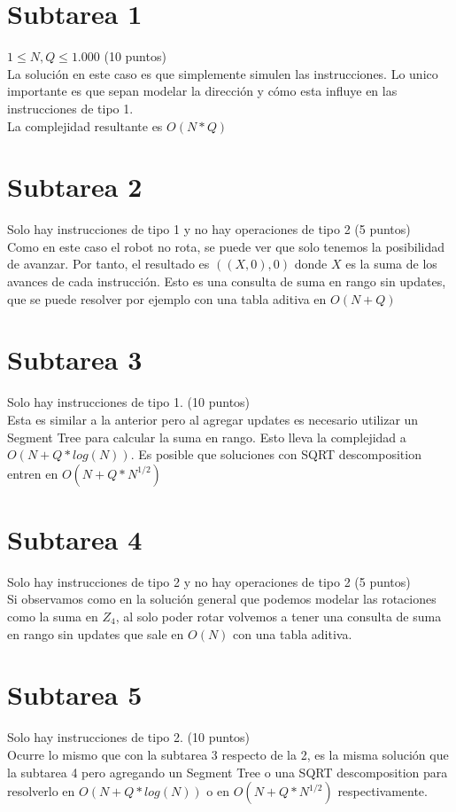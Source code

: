 \documentclass{article}
\begin{document}
\section{Subtarea 1}
$1 \leq N,Q \leq 1.000$ (10 puntos)
\\ La solución en este caso es que simplemente simulen las instrucciones. Lo unico importante es que sepan modelar la dirección y cómo esta influye en las instrucciones de tipo 1.
\\ La complejidad resultante es $O(N*Q)$
\section{Subtarea 2}
Solo hay instrucciones de tipo 1 y no hay operaciones de tipo 2 (5 puntos)
\\Como en este caso el robot no rota, se puede ver que solo tenemos la posibilidad de avanzar. Por tanto, el resultado es $((X,0),0)$ donde $X$ es la suma de los avances de cada instrucción. Esto es una consulta de suma en rango sin updates, que se puede resolver por ejemplo con una tabla aditiva en $O(N+Q)$
\section{Subtarea 3}
Solo hay instrucciones de tipo 1. (10 puntos)
\\Esta es similar a la anterior pero al agregar updates es necesario utilizar un Segment Tree para calcular la suma en rango. Esto lleva la complejidad a $O(N+Q*log(N))$. Es posible que soluciones con SQRT descomposition entren en $O(N+Q*N^{1/2})$
\section{Subtarea 4}
Solo hay instrucciones de tipo 2 y no hay operaciones de tipo 2 (5 puntos)
\\ Si observamos como en la solución general que podemos modelar las rotaciones como la suma en $Z_4$, al solo poder rotar volvemos a tener una consulta de suma en rango sin updates que sale en $O(N)$ con una tabla aditiva.
\section{Subtarea 5}
Solo hay instrucciones de tipo 2. (10 puntos)
\\ Ocurre lo mismo que con la subtarea 3 respecto de la 2, es la misma solución que la subtarea 4 pero agregando un Segment Tree o una SQRT descomposition para resolverlo en $O(N+Q*log(N))$ o en $O(N+Q*N^{1/2})$ respectivamente.
\end{document}
